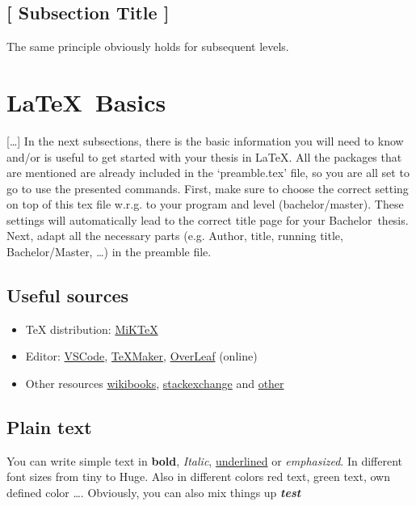 \documentclass[11pt,a4paper,english,oneside]{book}
\newcommand{\thesis}{Bachelor}
\begin{document}
\subsection{[ Subsection Title ]}

The same principle obviously holds for subsequent levels.

\section{\LaTeX\ Basics}

[\dots] In the next subsections, there is the basic information you will need to know and/or is useful to get started with your thesis in \LaTeX. All the packages that are mentioned are already included in the `preamble.tex' file, so you are all set to go to use the presented commands. First, make sure to choose the correct setting on top of this tex file w.r.g. to your program and level (bachelor/master). These settings will automatically lead to the correct title page for your \thesis\ thesis. Next, adapt all the necessary parts (e.g. Author, title, running title, Bachelor/Master, \ldots) in the preamble file.

\subsection{Useful sources}

\begin{itemize} %
    \item TeX distribution: \href{https://miktex.org/}{MiKTeX} %
    \item Editor: \href{https://code.visualstudio.com/}{VSCode}, \href{https://www.xm1math.net/texmaker/}{TeXMaker}, \href{https://www.overleaf.com/}{OverLeaf} (online)
    \item Other resources \href{https://en.wikibooks.org/wiki/LaTeX}{wikibooks}, \href{https://tex.stackexchange.com/}{stackexchange} and \href{http://www.tug.org/interest.html#free}{other}
\end{itemize}

\subsection{Plain text}

You can write simple text in \textbf{bold},  \textit{Italic}, \underline{underlined} or \emph{emphasized}. In different font sizes from {\tiny tiny} to {\Huge Huge}. Also in different colors {\color{Red} red text}, {\color{Green} green text},  {\color{MyColor1} own defined color} \ldots. Obviously, you can also mix things up {\color{Green} \Large \textbf{\textit{test}}}
\end{document}

